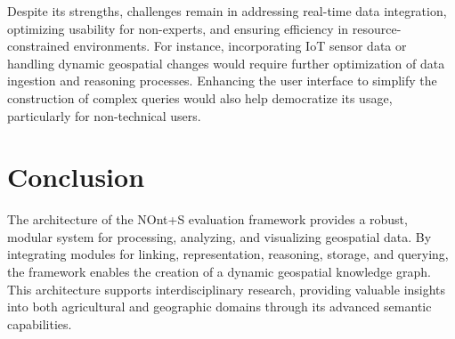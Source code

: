 Despite its strengths, challenges remain in addressing real-time data integration, optimizing usability for non-experts, and ensuring efficiency in resource-constrained environments. For instance, incorporating IoT sensor data or handling dynamic geospatial changes would require further optimization of data ingestion and reasoning processes. Enhancing the user interface to simplify the construction of complex queries would also help democratize its usage, particularly for non-technical users.


\section{Conclusion}

The architecture of the NOnt+S evaluation framework provides a robust, modular system for processing, analyzing, and visualizing geospatial data. By integrating modules for linking, representation, reasoning, storage, and querying, the framework enables the creation of a dynamic geospatial knowledge graph. This architecture supports interdisciplinary research, providing valuable insights into both agricultural and geographic domains through its advanced semantic capabilities.
